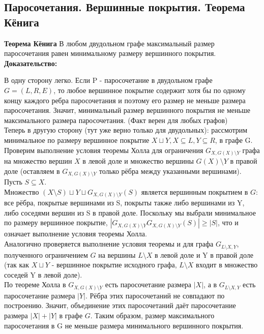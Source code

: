 \subsection{Паросочетания. Вершинные покрытия. Теорема Кёнига}

\textbf{Теорема Кёнига} В любом двудольном графе максимальный размер паросочетания равен минимальному размеру вершинного покрытия. \\

\noindent \textbf{Доказательство:} 

В одну сторону легко. Если P - паросочетание в двудольном графе $G =  (L, R, E)$, то любое вершинное покрытие содержит хотя бы по одному концу каждого ребра паросочетания и поэтому его размер не меньше размера паросочетания. Значит, минимальный размер вершинного покрытия не меньше максимального размера паросочетания. (Факт верен для любых графов) \\

Теперь в другую сторону (тут уже верно только для двудольных): рассмотрим минимальное по размеру вершинное покрытие $X \sqcup Y, X \subseteq L, Y \subseteq R$, в графе G. Проверим выполнение условия теоремы Холла для ограничения $G_{X, G(X) \setminus Y}$ графа на множество вершин $X$ в левой доле и множество вершины $G(X) \setminus Y$ в правой доле (оставляем в $G_{X, G(X) \setminus Y}$ только рёбра между указанными вершинами). Пусть $S \subseteq X$. \\

Множество $(X \setminus S) \sqcup Y \sqcup G_{X, G(X) \setminus Y}(S)$ является вершинным покрытием в $G$: все рёбра, покрытые вершинами из S, покрыты также либо вершинами из Y, либо соседями вершин из S в правой доле. Поскольку мы выбрали минимальное по размеру вершинное покрытие, $|G_{X, G(X) \setminus Y}G_{X, G(X) \setminus Y}(S)| \geq |S|$, что и означает выполнение условия теоремы Холла. \\

Аналогично проверяется выполнение условия теоремы и для графа $G_{L \setminus X, Y}$, полученного ограничением $G$ на вершины $L \setminus X$ в левой доле и Y в правой доле (так как $X \sqcup Y$ - вершинное покрытие исходного графа, $L \setminus X$ входит в множество соседей Y в левой доле). \\

По теореме Холла в $G_{X, G(X) \setminus Y}$ есть паросочетание размера $|X|$, а в $G_{L \setminus X, Y} $ есть паросочетание размера $|Y|$. Рёбра этих паросочетаний не совпадают по построению. Значит, объединение этих паросочетаний даёт паросочетание размера $|X| + |Y|$ в графе $G$. Таким образом, размер максимального паросочетания в G не меньше размера минимального вершинного покрытия. \\
